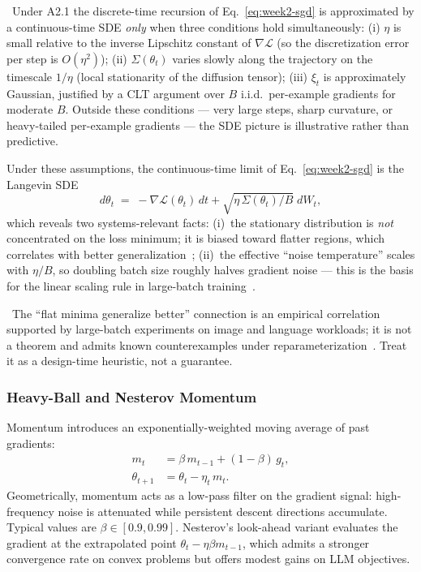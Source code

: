 \Assum\ Under A2.1 the discrete-time recursion of
Eq.~\eqref{eq:week2-sgd} is approximated by a continuous-time SDE
\emph{only} when three conditions hold simultaneously: (i) $\eta$ is
small relative to the inverse Lipschitz constant of
$\nabla \mathcal{L}$ (so the discretization error per step is
$O(\eta^{2})$); (ii) $\Sigma(\theta_t)$ varies slowly along the
trajectory on the timescale $1/\eta$ (local stationarity of the
diffusion tensor); (iii) $\xi_t$ is approximately Gaussian, justified
by a CLT argument over $B$ i.i.d.\ per-example gradients for moderate
$B$. Outside these conditions — very large steps, sharp curvature,
or heavy-tailed per-example gradients — the SDE picture is
illustrative rather than predictive.

Under these assumptions, the continuous-time limit of
Eq.~\eqref{eq:week2-sgd} is the Langevin SDE
\begin{equation}
\label{eq:week2-langevin}
d\theta_t \;=\; -\nabla \mathcal{L}(\theta_t)\, dt
                + \sqrt{\eta\,\Sigma(\theta_t)/B}\; dW_t,
\end{equation}
which reveals two systems-relevant facts:
(i)~the stationary distribution is \emph{not} concentrated on the loss
minimum; it is biased toward flatter regions, which correlates with better
generalization~\citep{keskar2017large};
(ii)~the effective ``noise temperature'' scales with $\eta/B$, so doubling
batch size roughly halves gradient noise — this is the basis for the
linear scaling rule in large-batch training~\citep{goyal2017accurate}.

\Emp\ The ``flat minima generalize better'' connection is an
empirical correlation supported by large-batch experiments on image
and language workloads; it is not a theorem and admits known
counterexamples under reparameterization~\citep{dinh2017sharp}. Treat
it as a design-time heuristic, not a guarantee.

\subsubsection{Heavy-Ball and Nesterov Momentum}

Momentum introduces an exponentially-weighted moving average of past
gradients:
\begin{align}
m_t &= \beta\, m_{t-1} + (1-\beta)\, g_t, \label{eq:week2-momentum-m} \\
\theta_{t+1} &= \theta_t - \eta_t\, m_t.
\end{align}
Geometrically, momentum acts as a low-pass filter on the gradient signal:
high-frequency noise is attenuated while persistent descent directions
accumulate. Typical values are $\beta \in [0.9, 0.99]$. Nesterov's
look-ahead variant evaluates the gradient at the extrapolated point
$\theta_t - \eta \beta m_{t-1}$, which admits a stronger convergence
rate on convex problems but offers modest gains on LLM objectives.

